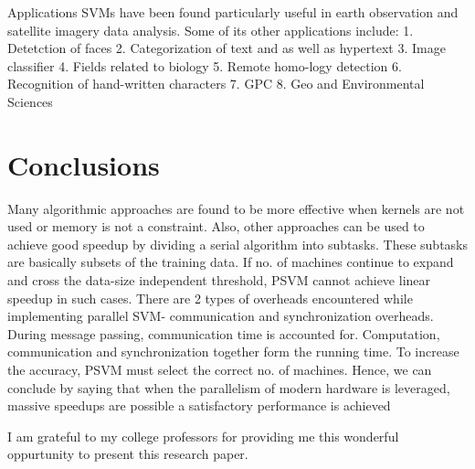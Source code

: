 \documentclass[aps,floatfix,prd,showpacs]{revtex4}
\begin{document}
Applications SVMs have been found particularly useful in earth observation and satellite imagery data analysis. Some of its other applications include: 1. Detetction of faces 2. Categorization of text and as well as hypertext 3. Image classifier 4. Fields related to biology 5. Remote homo-logy detection 6. Recognition of hand-written characters 7. GPC 8. Geo and Environmental Sciences 

\section{Conclusions}

Many algorithmic approaches are found to be more effective when kernels are not used or memory is not a constraint. Also, other approaches can be used to achieve good speedup by dividing a serial algorithm into subtasks. These subtasks are basically subsets of the training data. If no. of machines continue to expand and cross the data-size independent threshold, PSVM cannot achieve linear speedup in such cases. There are 2 types of overheads encountered while implementing parallel SVM- communication and synchronization overheads. During message passing, communication time is accounted for.  Computation, communication and synchronization together form the running time. To increase the accuracy, PSVM must select the correct no. of machines.  Hence, we can conclude by saying that when the parallelism of modern hardware is leveraged, massive speedups are possible a satisfactory performance is achieved

\acknowledgments
I am grateful to my college professors for providing me this wonderful oppurtunity to present this research paper.
\end{document}
